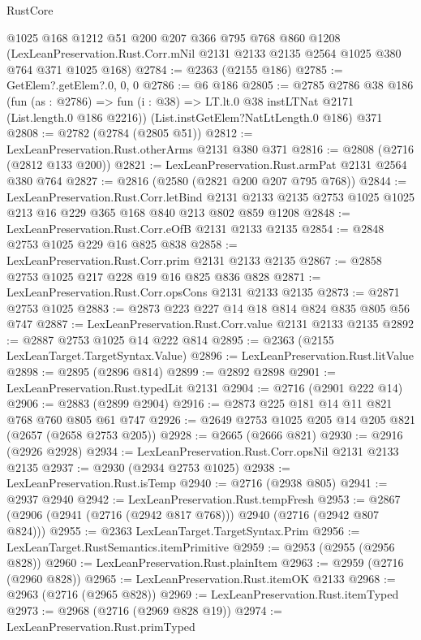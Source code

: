 \begin{lexlean}{RustCore}
\begin{coremodule}
    @1025
    @168
    @1212
    @51
    @200
    @207
    @366
    @795
    @768
    @860
    @1208
    (LexLeanPreservation.Rust.Corr.mNil @2131 @2133 @2135 @2564 @1025 @380 @764 @371 @1025 @168)
@2784 := @2363 (@2155 @186)
@2785 := GetElem?.getElem?.{0, 0, 0}
@2786 := @6 @186
@2805 := @2785
    @2786
    @38
    @186
    (fun (as : @2786) =>
    fun (i : @38) => LT.lt.{0} @38 instLTNat @2171 (List.length.{0} @186 @2216))
    (List.instGetElem?NatLtLength.{0} @186)
    @371
@2808 := @2782 (@2784 (@2805 @51))
@2812 := LexLeanPreservation.Rust.otherArms @2131 @380 @371
@2816 := @2808 (@2716 (@2812 @133 @200))
@2821 := LexLeanPreservation.Rust.armPat @2131 @2564 @380 @764
@2827 := @2816 (@2580 (@2821 @200 @207 @795 @768))
@2844 := LexLeanPreservation.Rust.Corr.letBind
    @2131
    @2133
    @2135
    @2753
    @1025
    @1025
    @213
    @16
    @229
    @365
    @168
    @840
    @213
    @802
    @859
    @1208
@2848 := LexLeanPreservation.Rust.Corr.eOfB @2131 @2133 @2135
@2854 := @2848 @2753 @1025 @229 @16 @825 @838
@2858 := LexLeanPreservation.Rust.Corr.prim @2131 @2133 @2135
@2867 := @2858 @2753 @1025 @217 @228 @19 @16 @825 @836 @828
@2871 := LexLeanPreservation.Rust.Corr.opsCons @2131 @2133 @2135
@2873 := @2871 @2753 @1025
@2883 := @2873 @223 @227 @14 @18 @814 @824 @835 @805 @56 @747
@2887 := LexLeanPreservation.Rust.Corr.value @2131 @2133 @2135
@2892 := @2887 @2753 @1025 @14 @222 @814
@2895 := @2363 (@2155 LexLeanTarget.TargetSyntax.Value)
@2896 := LexLeanPreservation.Rust.litValue
@2898 := @2895 (@2896 @814)
@2899 := @2892 @2898
@2901 := LexLeanPreservation.Rust.typedLit @2131
@2904 := @2716 (@2901 @222 @14)
@2906 := @2883 (@2899 @2904)
@2916 := @2873 @225 @181 @14 @11 @821 @768 @760 @805 @61 @747
@2926 := @2649 @2753 @1025 @205 @14 @205 @821 (@2657 (@2658 @2753 @205))
@2928 := @2665 (@2666 @821)
@2930 := @2916 (@2926 @2928)
@2934 := LexLeanPreservation.Rust.Corr.opsNil @2131 @2133 @2135
@2937 := @2930 (@2934 @2753 @1025)
@2938 := LexLeanPreservation.Rust.isTemp
@2940 := @2716 (@2938 @805)
@2941 := @2937 @2940
@2942 := LexLeanPreservation.Rust.tempFresh
@2953 := @2867 (@2906 (@2941 (@2716 (@2942 @817 @768))) @2940 (@2716 (@2942 @807 @824)))
@2955 := @2363 LexLeanTarget.TargetSyntax.Prim
@2956 := LexLeanTarget.RustSemantics.itemPrimitive
@2959 := @2953 (@2955 (@2956 @828))
@2960 := LexLeanPreservation.Rust.plainItem
@2963 := @2959 (@2716 (@2960 @828))
@2965 := LexLeanPreservation.Rust.itemOK @2133
@2968 := @2963 (@2716 (@2965 @828))
@2969 := LexLeanPreservation.Rust.itemTyped
@2973 := @2968 (@2716 (@2969 @828 @19))
@2974 := LexLeanPreservation.Rust.primTyped

\end{coremodule}
\end{lexlean}
